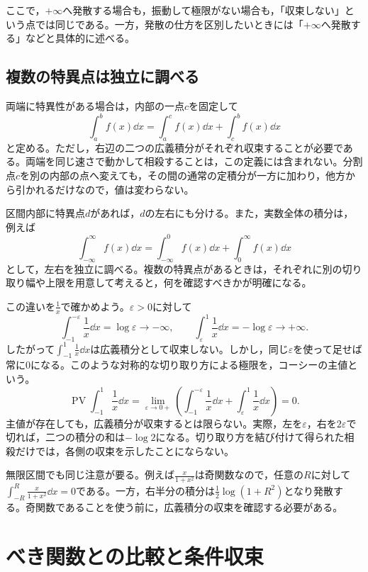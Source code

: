 ここで，$+\infty$へ発散する場合も，振動して極限がない場合も，「収束しない」という点では同じである。一方，発散の仕方を区別したいときには「$+\infty$へ発散する」などと具体的に述べる。

\subsection{複数の特異点は独立に調べる}

両端に特異性がある場合は，内部の一点$c$を固定して
\[
 \int_a^bf(x)\dd x
 =\int_a^cf(x)\dd x+\int_c^bf(x)\dd x
\]
と定める。ただし，右辺の二つの広義積分がそれぞれ収束することが必要である。両端を同じ速さで動かして相殺することは，この定義には含まれない。分割点$c$を別の内部の点へ変えても，その間の通常の定積分が一方に加わり，他方から引かれるだけなので，値は変わらない。

区間内部に特異点$d$があれば，$d$の左右にも分ける。また，実数全体の積分は，例えば
\[
 \int_{-\infty}^{\infty}f(x)\dd x
 =\int_{-\infty}^{0}f(x)\dd x+\int_0^{\infty}f(x)\dd x
\]
として，左右を独立に調べる。複数の特異点があるときは，それぞれに別の切り取り幅や上限を用意して考えると，何を確認すべきかが明確になる。

この違いを$\frac1x$で確かめよう。$\varepsilon>0$に対して
\[
 \int_{-1}^{-\varepsilon}\frac1x\dd x=\log\varepsilon\longrightarrow-\infty,
 \qquad
 \int_{\varepsilon}^{1}\frac1x\dd x=-\log\varepsilon\longrightarrow+\infty.
\]
したがって$\int_{-1}^1\frac1x\dd x$は広義積分として収束しない。しかし，同じ$\varepsilon$を使って足せば常に$0$になる。このような対称的な切り取り方による極限を，コーシーの主値という。
\[
 \operatorname{PV}\int_{-1}^1\frac1x\dd x
 =\lim_{\varepsilon\to0+}
 \left(\int_{-1}^{-\varepsilon}\frac1x\dd x
       +\int_{\varepsilon}^{1}\frac1x\dd x\right)=0.
\]
主値が存在しても，広義積分が収束するとは限らない。実際，左を$\varepsilon$，右を$2\varepsilon$で切れば，二つの積分の和は$-\log2$になる。切り取り方を結び付けて得られた相殺だけでは，各側の収束を示したことにならない。

無限区間でも同じ注意が要る。例えば$\frac{x}{1+x^2}$は奇関数なので，任意の$R$に対して$\int_{-R}^R\frac{x}{1+x^2}\dd x=0$である。一方，右半分の積分は$\frac12\log(1+R^2)$となり発散する。奇関数であることを使う前に，広義積分の収束を確認する必要がある。

\section{べき関数との比較と条件収束}\label{節:広義積分の判定}

